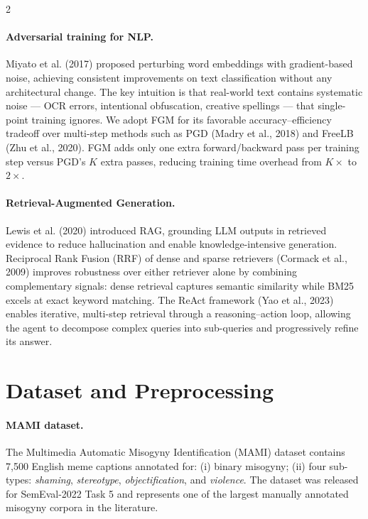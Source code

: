 \documentclass[11pt]{article}
\begin{document}
\begin{multicols}{2}
\paragraph{Adversarial training for NLP.}
Miyato et al. (2017) proposed perturbing word embeddings with gradient-based noise, achieving consistent improvements on text classification without any architectural change. The key intuition is that real-world text contains systematic noise — OCR errors, intentional obfuscation, creative spellings — that single-point training ignores. We adopt FGM for its favorable accuracy–efficiency tradeoff over multi-step methods such as PGD (Madry et al., 2018) and FreeLB (Zhu et al., 2020). FGM adds only one extra forward/backward pass per training step versus PGD's $K$ extra passes, reducing training time overhead from $K\times$ to $2\times$.

\paragraph{Retrieval-Augmented Generation.}
Lewis et al. (2020) introduced RAG, grounding LLM outputs in retrieved evidence to reduce hallucination and enable knowledge-intensive generation. Reciprocal Rank Fusion (RRF) of dense and sparse retrievers (Cormack et al., 2009) improves robustness over either retriever alone by combining complementary signals: dense retrieval captures semantic similarity while BM25 excels at exact keyword matching. The ReAct framework (Yao et al., 2023) enables iterative, multi-step retrieval through a reasoning–action loop, allowing the agent to decompose complex queries into sub-queries and progressively refine its answer.

\section{Dataset and Preprocessing}

\paragraph{MAMI dataset.}
The Multimedia Automatic Misogyny Identification (MAMI) dataset contains 7{,}500 English meme captions annotated for: (i) binary misogyny; (ii) four sub-types: \textit{shaming}, \textit{stereotype}, \textit{objectification}, and \textit{violence}. The dataset was released for SemEval-2022 Task 5 and represents one of the largest manually annotated misogyny corpora in the literature.


\end{multicols}
\end{document}
